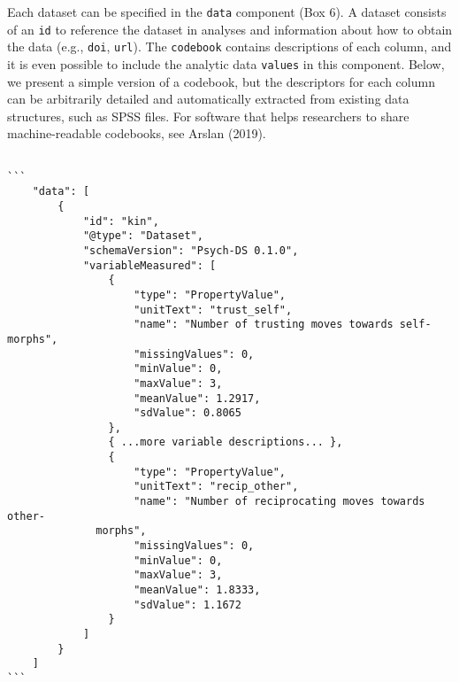 \documentclass[english,doc,floatsintext]{apa6}
\begin{document}
Each dataset can be specified in the \texttt{data} component (Box 6). A dataset consists of an \texttt{id} to reference the dataset in analyses and information about how to obtain the data (e.g., \texttt{doi}, \texttt{url}). The \texttt{codebook} contains descriptions of each column, and it is even possible to include the analytic data \texttt{values} in this component. Below, we present a simple version of a codebook, but the descriptors for each column can be arbitrarily detailed and automatically extracted from existing data structures, such as SPSS files. For software that helps researchers to share machine-readable codebooks, see Arslan (2019).

\begin{tcolorbox}[colback=black!5!white,colframe=white!5!black,title=Box 6. The data component.]
\begin{verbatim}

```
    "data": [
        {
            "id": "kin",
            "@type": "Dataset",
            "schemaVersion": "Psych-DS 0.1.0",
            "variableMeasured": [
                {
                    "type": "PropertyValue",
                    "unitText": "trust_self",
                    "name": "Number of trusting moves towards self-morphs",
                    "missingValues": 0,
                    "minValue": 0,
                    "maxValue": 3,
                    "meanValue": 1.2917,
                    "sdValue": 0.8065
                },
                { ...more variable descriptions... },
                {
                    "type": "PropertyValue",
                    "unitText": "recip_other",
                    "name": "Number of reciprocating moves towards other-
              morphs",
                    "missingValues": 0,
                    "minValue": 0,
                    "maxValue": 3,
                    "meanValue": 1.8333,
                    "sdValue": 1.1672
                }
            ]
        }
    ]
```

\end{verbatim}
\end{tcolorbox}
\end{document}

